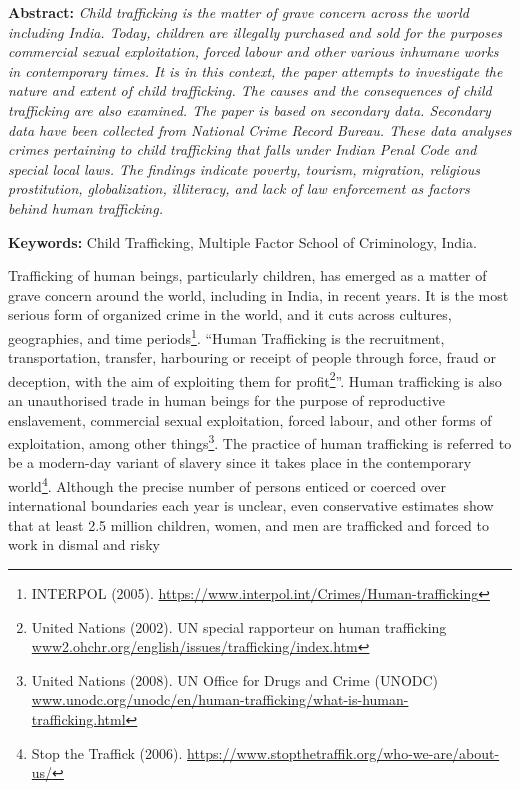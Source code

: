 \setcounter{figure}{0}
\setcounter{table}{0}
\setcounter{footnote}{0}

\label{2016-art5}

\vspace{-.3cm}




\begin{multicols}{2}

\noi
\textbf{Abstract:} {\it Child trafficking is the matter of grave concern across the world including India. Today, children are illegally purchased and sold for the purposes commercial sexual exploitation, forced labour and other various inhumane works in contemporary times. It is in this context, the paper attempts to investigate the nature and extent of child trafficking. The causes and the consequences of child trafficking are also examined. The paper is based on secondary data. Secondary data have been collected from National Crime Record Bureau. These data analyses crimes pertaining to child trafficking that falls under Indian Penal Code and special local laws. The findings indicate poverty, tourism, migration, religious prostitution, globalization, illiteracy, and lack of law enforcement as factors behind human trafficking.}

\noi
{\bf Keywords:} Child Trafficking, Multiple Factor School of Criminology, India.

\noi
Trafficking of human beings, particularly children, has emerged as a matter of grave concern around the world, including in India, in recent years. It is the most serious form of organized crime in the world, and it cuts across cultures, geographies, and time periods\footnote{INTERPOL (2005). \url{https://www.interpol.int/Crimes/Human-trafficking}}. “Human Trafficking is the recruitment, transportation, transfer, harbouring or receipt of people through force, fraud or deception, with the aim of exploiting them for profit\footnote{United Nations (2002). UN special rapporteur on human trafficking	\url{www2.ohchr.org/english/issues/trafficking/index.htm}}”. Human trafficking is also an unauthorised trade in human beings for the purpose of reproductive enslavement, commercial sexual exploitation, forced labour, and other forms of exploitation, among other things\footnote{United Nations (2008). UN Office for Drugs and Crime (UNODC)	                                                                  \url{www.unodc.org/unodc/en/human-trafficking/what-is-human-trafficking.html}}. The practice of human trafficking is referred to be a modern-day variant of slavery since it takes place in the contemporary world\footnote{Stop the Traffick (2006). \url{https://www.stopthetraffik.org/who-we-are/about-us/}}. Although the precise number of persons enticed or coerced over international boundaries each year is unclear, even conservative estimates show that at least 2.5 million children, women, and men are trafficked and forced to work in dismal and risky 


\end{multicols}

